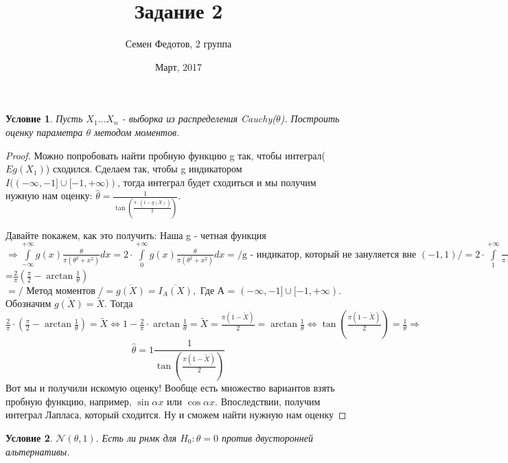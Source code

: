 \documentclass{article}
\title{Задание 2}
\author{Семен Федотов, 2 группа}
\date{Март, 2017}
\theoremstyle{plain}
\newtheorem{condi}{Условие}
\theoremstyle{definition}
\begin{document}
	\maketitle


\begin{condi}
	Пусть $X_1 \dots X_n$ - выборка из распределения Cauchy($\theta$). Построить оценку параметра $\theta$ методом моментов.
\end{condi}

\begin{proof}
	Можно попробовать найти пробную функцию g так, чтобы интеграл($Eg(X_1)$) сходился. Сделаем так, чтобы g индикатором $I(\left(-\infty, -1 \rbrack \cup \lbrack-1, +\infty)\right) $, тогда интеграл будет сходиться и мы получим нужную нам оценку: $\hat{\theta} = \frac{1}{\tan(\frac{\pi \cdot(1 - \overline{g(X)})}{2})}$.
	
	Давайте покажем, как это получить: Наша g - четная функция $\Rightarrow \int\limits_{-\infty}^{+\infty}{g(x) \frac{\theta}{\pi(\theta^2 + x^2)}}dx = 2 \cdot \int\limits_{0}^{+\infty}{g(x) \frac{\theta}{\pi(\theta^2 + x^2)}}dx = / \text{g - индикатор, который не зануляется вне } \left(-1, 1\right) / = 2 \cdot \int\limits_{1}^{+\infty}{\frac{\theta}{\pi(\theta^2 + x^2)}}dx = \frac{2\theta}{\pi} \int\limits_{1}^{+\infty}{\frac{1}{(\theta^2 + x^2)}}dx =  \frac{2}{\pi\theta} \int\limits_{1}^{+\infty}{\frac{1}{(1 + \frac{x^2}{\theta^2})}}dx = / \text{Внесем под дифференциал } 
	 \frac{x}{\theta} / = \frac{2}{\pi} \int\limits_{1}^{+\infty}{\frac{1}{(1 + (\frac{x}{\theta})^2)}}d\frac{x}{\theta} 
	  = \frac{2}{\pi} \cdot \arctan(\frac{x}{\theta}) \mid_1^{+\infty} 
	  $=$  \frac{2}{\pi}(\frac{\pi}{2} - \arctan{\frac{1}{\theta}})$ 
	  $ = / \text{ Метод моментов } / = \overline{g(X)} = \overline{I_A(X)}, \text{ Где А = } ( -\infty, -1] \cup [-1, +\infty).$ Обозначим $\overline{g(X)} = \tilde{X}$. Тогда $\frac{2}{\pi} \cdot(\frac{\pi}{2} - \arctan{\frac{1}{\theta}}) = \tilde{X} \Leftrightarrow 1 - \frac{2}{\pi} \cdot \arctan{\frac{1}{\theta}} = \tilde{X} = \frac{\pi(1 - \tilde{X})}{2} = \arctan{\frac{1}{\theta}} \Leftrightarrow \tan(\frac{\pi(1 - \tilde{X})}{2}) = \frac{1}{\theta} \Rightarrow $ $$\hat{\theta} = 1\frac{1}{\tan(\frac{\pi(1 - \tilde{X})}{2})}$$ Вот мы и получили искомую оценку! Вообще есть множество вариантов взять пробную функцию, например, $\sin{\alpha x}$ или $\cos{\alpha x}$. Впоследствии, получим интеграл Лапласа, который сходится. Ну и сможем найти нужную нам оценку
\end{proof}


\begin{condi}
	$\mathcal{N}(\theta, 1).$ Есть ли рнмк для $H_0 : \theta = 0$ против двусторонней альтернативы.
\end{condi}
\end{document}
